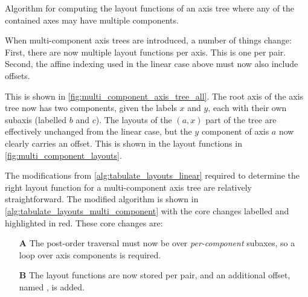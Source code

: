 \documentclass[thesis]{subfiles}
\begin{document}
\begin{algorithm}

  \caption{
    Algorithm for computing the layout functions of an axis tree where any of the contained axes may have multiple components.
  }
  \label{alg:tabulate_layouts_multi_component}
\end{algorithm}

When multi-component axis trees are introduced, a number of things change:
First, there are now multiple layout functions per axis.
This is one per  pair.
Second, the affine indexing used in the linear case above must now also include offsets.

This is shown in \cref{fig:multi_component_axis_tree_all}.
The root axis of the axis tree now has two components, given the labels $x$ and $y$, each with their own subaxis (labelled $b$ and $c$).
The layouts of the $(a, x)$ part of the tree are effectively unchanged from the linear case, but the $y$ component of axis $a$ now clearly carries an offset.
This is shown in the layout functions in \cref{fig:multi_component_layouts}.

The modifications from \cref{alg:tabulate_layouts_linear} required to determine the right layout function for a multi-component axis tree are relatively straightforward.
The modified algorithm is shown in \cref{alg:tabulate_layouts_multi_component} with the core changes labelled and highlighted in red.
These core changes are:
\begin{itemize}
  \item[\textbf{A}] The post-order traversal must now be over \textit{per-component} subaxes, so a loop over axis components is required.
  \item[\textbf{B}] The layout functions are now stored per  pair, and an additional offset, named , is added.
\end{itemize}
\end{document}

